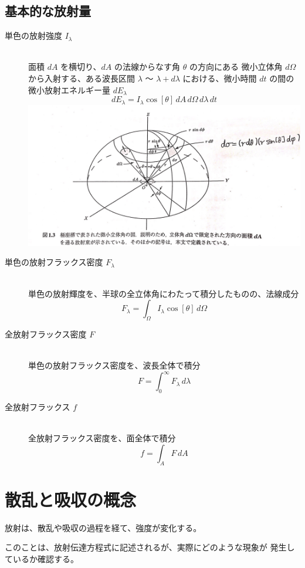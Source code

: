\documentclass[article]{dennou777}
\begin{document}
\subsection{基本的な放射量}
\begin{description}
	\item[単色の放射強度 $I_\lambda$]\leavevmode\\
		面積 $dA$ を横切り、$dA$ の法線からなす角 $\theta$ の方向にある
		微小立体角 $d\Omega$ から入射する、ある波長区間 $\lambda$ 〜
		$\lambda+d\lambda$ における、微小時間 $dt$ の間の微小放射エネルギー量
		$dE_\lambda$
		\[dE_\lambda=I_\lambda\cos[\theta]\,dA\,d\Omega\,d\lambda\,dt\]
		\includegraphics[width=\linewidth]{eq.jpg}
\end{description}

\begin{description}
	\item[単色の放射フラックス密度 $F_\lambda$]\leavevmode\\
		単色の放射輝度を、半球の全立体角にわたって積分したものの、法線成分
		\[F_\lambda=\int_\Omega I_\lambda\cos[\theta]\,d\Omega\]
	\item[全放射フラックス密度 $F$]\leavevmode\\
		単色の放射フラックス密度を、波長全体で積分
		\[F=\int^\infty_0 F_\lambda\,d\lambda\]
	\item[全放射フラックス $f$]\leavevmode\\
		全放射フラックス密度を、面全体で積分
		\[f=\int_AF\,dA\]
\end{description}

\section{散乱と吸収の概念}
放射は、散乱や吸収の過程を経て、強度が変化する。

このことは、放射伝達方程式に記述されるが、実際にどのような現象が
発生しているか確認する。
\end{document}
